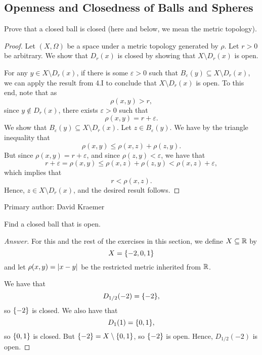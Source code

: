 \subsection{Openness and Closedness of Balls and Spheres}

\begin{minorEx}
    Prove that a closed ball is closed (here and below, we mean the metric
    topology).
\end{minorEx}

\begin{proof}
    Let $(X, \Omega)$ be a space under a metric topology generated by $\rho$.
    Let $r > 0$ be arbitrary.
    We show that $D_{r}(x)$ is closed by showing that $X \setminus D_{r}(x)$ is
    open. 

    For any $y \in X \setminus D_{r}(x)$, if there is some $\varepsilon > 0$
    such that $B_{\varepsilon}(y) \subseteq X \setminus D_{r}(x)$, we can apply
    the result from 4.I to conclude that $X \setminus D_{r}(x)$ is open. To this
    end, note that as
    \[
        \rho(x, y) > r,
    \]
    since $y \notin D_{r}(x)$, there exists $\varepsilon > 0$ such that
    \[
        \rho(x, y) = r + \varepsilon.
    \]
    We show that $B_{\varepsilon}(y) \subseteq X \setminus D_{r}(x)$. Let $z \in
    B_{\varepsilon}(y)$. We have by the triangle inequality that
    \[
        \rho(x, y) \leq \rho(x, z) + \rho(z, y).
    \]
    But since $\rho(x, y) = r + \varepsilon$, and since $\rho(z, y) <
    \varepsilon$, we have that
    \[
        r + \varepsilon = \rho(x, y) \leq \rho(x, z) + \rho(z, y) < \rho(x, z) +
        \varepsilon,
    \]
    which implies that 
    \[
        r < \rho(x, z).
    \]
    Hence, $z \in X \setminus D_{r}(x)$, and the desired result follows.
\end{proof}

Primary author: David Kraemer

\begin{minorEx}
    Find a closed ball that is open.
\end{minorEx}

\begin{proof}[Answer]
    For this and the rest of the exercises in this section, we define $X
    \subseteq \mathbb{R}$ by
    \[
        X = \{-2, 0, 1\}
    \]
    and let $\rho(x, y) = |x - y|$ be the restricted metric inherited from
    $\mathbb{R}$. 

    We have that
    \[
        D_{1/2}(-2) = \{-2\},
    \]
    so $\{-2\}$ is closed. We also have that
    \[
        D_{1}(1) = \{0, 1\},
    \]
    so $\{0, 1\}$ is closed. But $\{-2\} = X \setminus \{0, 1\}$, so
    $\{-2\}$ is open. Hence, $D_{1/2}(-2)$ is open.
\end{proof}

